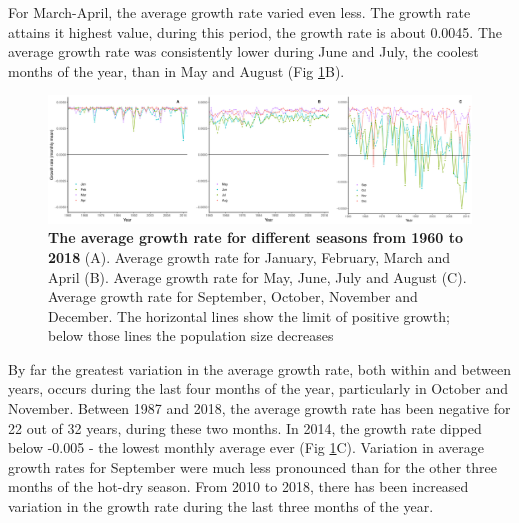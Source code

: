 \documentclass[12pt,a4paper]{article}
\begin{document}
For March-April, the average growth rate varied even less. The growth rate attains it highest value, during this period, the growth rate is about 0.0045. The average growth rate was consistently lower during June and July, the coolest months of the year, than in May and August (Fig \ref{fig:tsetseflowchat2}B).  

\begin{figure}[h]
	\centering
	\includegraphics[width=1.1\linewidth]{MonthlyGrowthRateDec12}
	\caption{ {\bf The average growth rate for different seasons from 1960 to 2018} (A). Average growth rate for January, February, March and April (B). Average growth rate for May, June, July and August (C). Average growth rate for September, October, November and December. The horizontal lines show the limit of positive growth; below those lines the population size decreases}
	\label{fig:tsetseflowchat2}
\end{figure}

\newpage

By far the greatest variation in the average growth rate, both within and between years, occurs during the last four months of the year, particularly in October and November. Between 1987 and 2018, the average growth rate has been negative for 22  out of 32 years, during these two months. In 2014, the growth rate dipped below -0.005 - the lowest monthly average ever (Fig \ref{fig:tsetseflowchat2}C). Variation in average growth rates for September were much less pronounced than for the other three months of the hot-dry season. From 2010 to 2018, there has been increased variation in the growth rate during the last three months of the year. 
\end{document}
